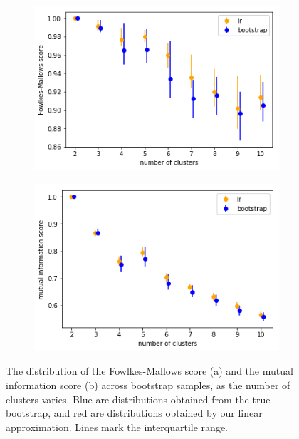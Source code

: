 \documentclass[a4paper]{article}
\begin{document}
\begin{figure}[h!]
	\centering
  \begin{subfigure}[t]{0.4\textwidth}
		\includegraphics[width = \textwidth]{./finite_mixture_figures/model_explorer_fm_scores.png}
		\subcaption{}
	\end{subfigure}
  \begin{subfigure}[t]{0.4\textwidth}
    \includegraphics[width = \textwidth]{./finite_mixture_figures/model_explorer_mi_scores.png}
    \subcaption{}
  \end{subfigure}
	\caption{The distribution of the Fowlkes-Mallows score (a) and the mutual information score (b) across bootstrap
  samples, as the number of clusters varies. Blue are distributions obtained from the true bootstrap,
	and red are distributions obtained by our linear approximation. Lines mark the interquartile range. }
  \label{fig:finite_mixture_model_explorer}
\end{figure}
\end{document}
